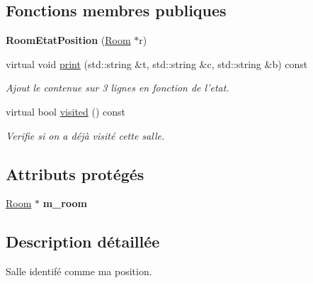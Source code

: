 \subsection*{Fonctions membres publiques}
\begin{DoxyCompactItemize}
\item 
\hypertarget{class_room_etat_position_a3633a62802450527044e6301e1bae887}{{\bfseries Room\-Etat\-Position} (\hyperlink{class_room}{Room} $\ast$r)}\label{class_room_etat_position_a3633a62802450527044e6301e1bae887}

\item 
virtual void \hyperlink{class_room_etat_position_a56ac0e9929a77a90ddd776f25f72ea65}{print} (std\-::string \&t, std\-::string \&c, std\-::string \&b) const 
\begin{DoxyCompactList}\small\item\em Ajout le contenue sur 3 lignes en fonction de l'etat. \end{DoxyCompactList}\item 
virtual bool \hyperlink{class_room_etat_position_aab1a503a6852677591c061c06513a5a8}{visited} () const 
\begin{DoxyCompactList}\small\item\em Verifie si on a déjà visité cette salle. \end{DoxyCompactList}\end{DoxyCompactItemize}
\subsection*{Attributs protégés}
\begin{DoxyCompactItemize}
\item 
\hypertarget{class_room_etat_a5b23317f60b9d268bbe669955b3c4725}{\hyperlink{class_room}{Room} $\ast$ {\bfseries m\-\_\-room}}\label{class_room_etat_a5b23317f60b9d268bbe669955b3c4725}

\end{DoxyCompactItemize}


\subsection{Description détaillée}
Salle identifé comme ma position. 

